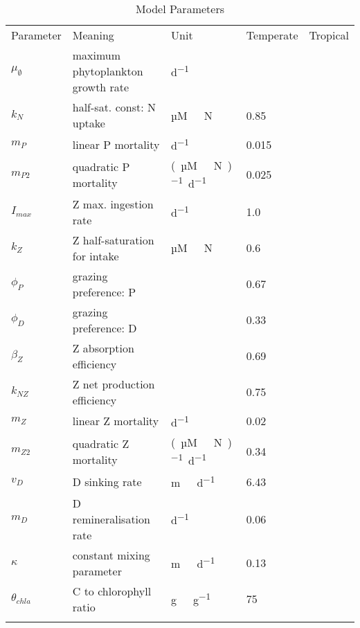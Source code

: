 \documentclass[template.tex]{subfiles}
\begin{document}
\begin{table*}[t]
\caption{Model Parameters}
\begin{tabular}{l l l l l}
Parameter & Meaning & Unit & Temperate & Tropical \\
\tophline

$\mu_{\emptyset}$ & maximum phytoplankton growth rate  & \unit{d^{-1}} & & \\
$k_N$ & half-sat. const: N uptake & \unit{µM \ N} & 0.85 & \\
$m_P$ & linear P mortality & \unit{d^{−1}} & 0.015 & \\
$m_{P2}$ & quadratic P mortality & \unit{(µM \ N)^{-1} d^{−1}} & 0.025 & \\
$I_{max}$ & Z max. ingestion rate & \unit{d^{−1}} & 1.0 & \\
$k_Z$ & Z half-saturation for intake & \unit{µM \ N} & 0.6 & \\
$\phi_P$ & grazing preference: P & & 0.67 & \\
$\phi_D$ & grazing preference: D & & 0.33 & \\
$\beta_Z$ & Z absorption efficiency & & 0.69 & \\
$k_{NZ}$ & Z net production efficiency & & 0.75 &  \\
$m_Z$ & linear Z mortality  & \unit{d^{−1}} & 0.02 & \\
$m_{Z2}$ & quadratic Z mortality & \unit{(µM \ N)^{-1} d^{−1}} & 0.34 & \\
$v_D$ & D sinking rate & \unit{m \ d^{−1}} & 6.43 & \\
$m_D$ & D remineralisation rate & \unit{d^{−1}} & 0.06 & \\
$\kappa$ & constant mixing parameter & \unit{m \ d^{−1}} & 0.13 & \\
$\theta_{chla}$ & C to chlorophyll ratio & \unit{g \ g^{-1}} & 75 & \\
\middlehline

\bottomhline
\end{tabular}
\label{appendix:table:usecase1parameters}
\end{table*}
%
\clearpage

\biblio
\end{document}
